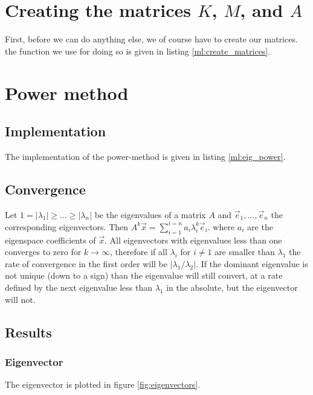
\usepackage[]{algorithm2e}
\usepackage[T1]{fontenc}          %
\usepackage[framed,numbered]{matlab-prettifier}

\tableofcontents

\section{Creating the matrices \texorpdfstring{$K$}{\em K}, \texorpdfstring{$M$}{\em M}, and \texorpdfstring{$A$}{\em A}}
  First, before we can do anything else, we of course have to create our matrices.
  the function we use for doing so is given in listing \ref{ml:create_matrices}.
\section{Power method}
\subsection{Implementation}
The implementation of the power-method is given in listing \ref{ml:eig_power}.

\subsection{Convergence}
 Let $1 = |\lambda_1| \geq \ldots \geq |\lambda_n|$ be the eigenvalues of a matrix $A$ and $\vec e_1, \ldots, \vec e_n$ the corresponding eigenvectors.
 Then $A^k \vec x = \sum_{i=1} ^{i=n} a_i\lambda_i^k\vec e_i$. where $a_i$ are the eigenspace coefficients of $\vec x$.
 All eigenvectors with eigenvalues less than one converges to zero for $k\to\infty$, therefore if all $\lambda_i$ for $i\not = 1$ are smaller than $\lambda_1$ the rate of convergence in the first order
 will be $\left|\lambda_1/\lambda_2\right|$. If the dominant eigenvalue is not unique (down to a sign) than the eigenvalue will still convert, at a rate defined by the next eigenvalue less than $\lambda_1$ in the absolute, but the eigenvector will not.
\subsection{Results}
\subsubsection{Eigenvector}
The eigenvector is plotted in figure \ref{fig:eigenvectors}.
